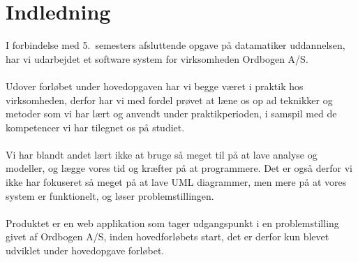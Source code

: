 \section{Indledning}
I forbindelse med 5.\ semesters afsluttende opgave på datamatiker uddannelsen, har vi udarbejdet et software system for virksomheden Ordbogen A/S.
\\\\
Udover forløbet under hovedopgaven har vi begge været i praktik hos virksomheden, derfor har vi med fordel prøvet at læne os op ad teknikker og metoder
som vi har lært og anvendt under praktikperioden, i samspil med de kompetencer vi har tilegnet os på studiet.
\\\\
Vi har blandt andet lært ikke at bruge så meget til på at lave analyse og modeller, og lægge vores tid og kræfter på at programmere.
Det er også derfor vi ikke har fokuseret så meget på at lave UML diagrammer, men mere på at vores system er funktionelt, og løser problemstillingen.
\\\\
Produktet er en web applikation som tager udgangspunkt i en problemstilling givet af Ordbogen A/S, inden hovedforløbets start, det er derfor kun blevet udviklet under
hovedopgave forløbet.
